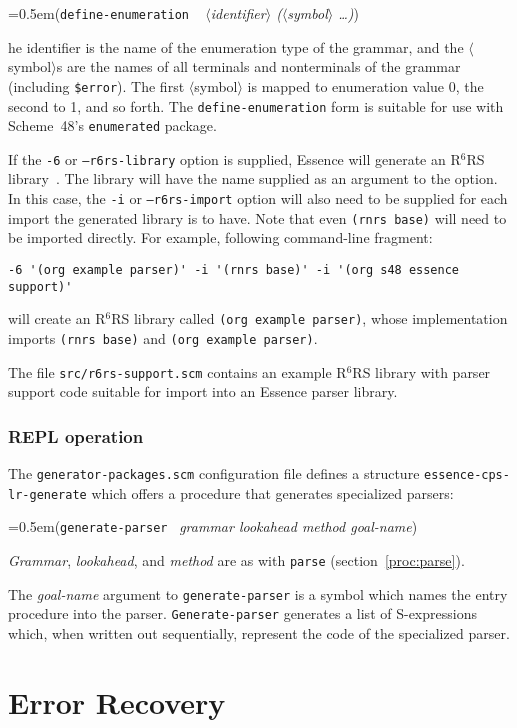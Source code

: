 \documentclass{article}
\newcommand{\meta}[1]{\textrm{$\langle$#1$\rangle$}}
\newcommand{\var}[1]{\textit{#1}}
\newcommand{\ide}[1]{{\frenchspacing\textnormal{\texttt{#1}}}}
\newcommand{\pproto}[2]{\noindent%
{\texonly\spaceskip=0.5em\endtexonly{}#1}%
~\nobreak\textrm{#2}}
\newcommand{\proto}[3]{\par\bigskip\begin{flushleft}\pproto{(\texttt{#1}}{\textit{#2})}\hspace*{\fill}{#3}\end{flushleft}}
\newcommand{\codefont}[1]{\texttt{#1}}
\newcommand{\filename}[1]{\texttt{#1}}
\begin{document}
\proto{define-enumeration}{ \meta{identifier} (\meta{symbol} \ldots)}

The identifier is the name of the enumeration type of the grammar, and
the \meta{symbol}s are the names of all terminals and nonterminals of
the grammar (including \texttt{\$error}).  The first \meta{symbol} is
mapped to enumeration value 0, the second to 1, and so forth.  The
\texttt{define-enumeration} form is suitable for use with Scheme~48's
\texttt{enumerated} package.

If the \texttt{-6} or \texttt{--r6rs-library} option is supplied,
Essence will generate an R$^6$RS library~\cite{R6RS}.  The library
will have the name supplied as an argument to the option.  In this case,
the \texttt{-i} or \texttt{--r6rs-import} option will also need to be
supplied for each import the generated library is to have.  Note that
even \texttt{(rnrs base)} will need to be imported directly.   For
example, following command-line fragment:

\begin{verbatim}
-6 '(org example parser)' -i '(rnrs base)' -i '(org s48 essence support)'
\end{verbatim}
%
will create an R$^6$RS library called \texttt{(org example parser)},
whose implementation imports \texttt{(rnrs base)} and \texttt{(org
  example parser)}.

The file \texttt{src/r6rs-support.scm} contains an example R$^6$RS
library with parser support code suitable for import into an Essence
parser library.

\subsubsection*{REPL operation}
The \filename{generator-packages.scm} configuration file defines a
structure \codefont{essence-cps-lr-generate} which offers a procedure that
generates specialized parsers:

\proto{generate-parser}{grammar lookahead method goal-name}{procedure}
%
\var{Grammar}, \var{lookahead}, and \var{method} are as with
\codefont{parse} (section~\ref{proc:parse}).

The \var{goal-name} argument to \ide{generate-parser} is a symbol
which names the entry procedure into the parser.
\ide{Generate-parser} generates a list of S-expressions which, when
written out sequentially, represent the code of the specialized
parser.

\section{Error Recovery}
\label{sec:error-recovery}
\end{document}

